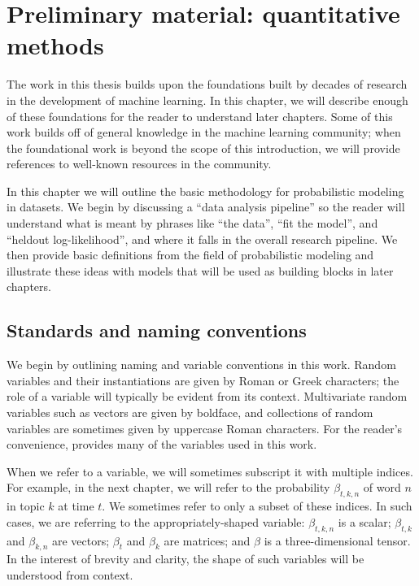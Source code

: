 \chapter{Preliminary material: quantitative methods}
\label{chapter:introductory_material}

The work in this thesis builds upon the foundations built by decades
of research in the development of machine learning.  In this chapter,
we will describe enough of these foundations for the reader to
understand later chapters. Some of this work builds off of general
knowledge in the machine learning community; when the foundational
work is beyond the scope of this introduction, we will provide
references to well-known resources in the community.

In this chapter we will outline the basic methodology for
probabilistic modeling in datasets.  We begin by discussing a ``data
analysis pipeline'' so the reader will understand what is meant by
phrases like ``the data'', ``fit the model'', and ``heldout
log-likelihood'', and where it falls in the overall research pipeline.
We then provide basic definitions from the field of probabilistic
modeling and illustrate these ideas with models that will be used as
building blocks in later chapters.

\section{Standards and naming conventions}
We begin by outlining naming and variable conventions in this work.
Random variables and their instantiations are given by Roman or Greek
characters; the role of a variable will typically be evident from its
context.  Multivariate random variables such as vectors are given by
boldface, and collections of random variables are sometimes given by
uppercase Roman characters.  For the reader's convenience,
 provides many of the variables used in this work.

When we refer to a variable, we will sometimes subscript it with
multiple indices.  For example, in the next chapter, we will refer to
the probability $\beta_{t,k,n}$ of word $n$ in topic $k$ at time
$t$. We sometimes refer to only a subset of these indices. In such
cases, we are referring to the appropriately-shaped variable:
$\beta_{t,k,n}$ is a scalar; $\beta_{t,k}$ and $\beta_{k,n}$ are
vectors; $\beta_t$ and $\beta_k$ are matrices; and
$\beta$ is a three-dimensional tensor.  In the interest of brevity and
clarity, the shape of such variables will be understood from context.

